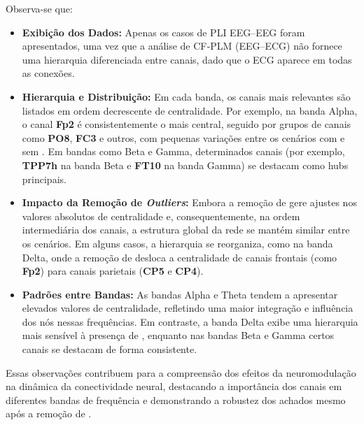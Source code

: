 Observa-se que:
\begin{itemize}
    \item \textbf{Exibição dos Dados:} Apenas os casos de PLI EEG–EEG foram apresentados, uma vez que a análise de CF‐PLM (EEG–ECG) não fornece uma hierarquia diferenciada entre canais, dado que o ECG aparece em todas as conexões.
    \item \textbf{Hierarquia e Distribuição:} Em cada banda, os canais mais relevantes são listados em ordem decrescente de centralidade. Por exemplo, na banda Alpha, o canal \textbf{Fp2} é consistentemente o mais central, seguido por grupos de canais como \textbf{PO8}, \textbf{FC3} e outros, com pequenas variações entre os cenários com e sem . Em bandas como Beta e Gamma, determinados canais (por exemplo, \textbf{TPP7h} na banda Beta e \textbf{FT10} na banda Gamma) se destacam como hubs principais.
    \item \textbf{Impacto da Remoção de \textit{Outliers}:} Embora a remoção de  gere ajustes nos valores absolutos de centralidade e, consequentemente, na ordem intermediária dos canais, a estrutura global da rede se mantém similar entre os cenários. Em alguns casos, a hierarquia se reorganiza, como na banda Delta, onde a remoção de  desloca a centralidade de canais frontais (como \textbf{Fp2}) para canais parietais (\textbf{CP5} e \textbf{CP4}).
    \item \textbf{Padrões entre Bandas:} As bandas Alpha e Theta tendem a apresentar elevados valores de centralidade, refletindo uma maior integração e influência dos nós nessas frequências. Em contraste, a banda Delta exibe uma hierarquia mais sensível à presença de , enquanto nas bandas Beta e Gamma certos canais se destacam de forma consistente.
\end{itemize}

Essas observações contribuem para a compreensão dos efeitos da neuromodulação na dinâmica da conectividade neural, destacando a importância dos canais em diferentes bandas de frequência e demonstrando a robustez dos achados mesmo após a remoção de .
